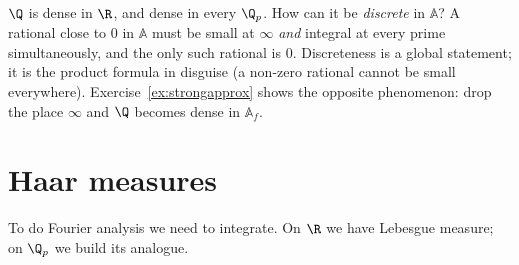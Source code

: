 \begin{think}
$\Q$ is dense in $\R$, and dense in every $\Q_p$. How can it be \emph{discrete} in $\mathbb{A}$? A rational close to $0$ in $\mathbb{A}$ must be
small at $\infty$ \emph{and} integral at every prime simultaneously, and the only such rational is $0$. Discreteness is a
global statement; it is the product formula in disguise (a non-zero rational cannot be small everywhere). Exercise~\ref{ex:strongapprox}
shows the opposite phenomenon: drop the place $\infty$ and $\Q$ becomes dense in $\mathbb{A}_f$.
\end{think}

\section{Haar measures}

To do Fourier analysis we need to integrate. On $\R$ we have Lebesgue measure; on $\Q_p$ we build its analogue.

